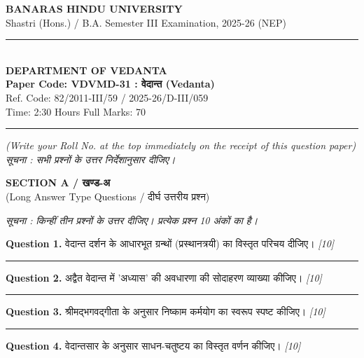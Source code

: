 \documentclass[11pt,a4paper]{article}
\newcommand{\pts}[1]{\hfill \textit{[#1]}}
\begin{document}
\begin{center}
  {\large\bfseries BANARAS HINDU UNIVERSITY}\\[2pt]
  {\normalsize Shastri (Hons.) / B.A. Semester III Examination, 2025-26 (NEP)}\\[6pt]
  \rule{0.8\linewidth}{0.5pt}\\[6pt]
  {\large\bfseries DEPARTMENT OF VEDANTA}\\[4pt]
  {\large\bfseries Paper Code: VDVMD-31 : वेदान्त (Vedanta)}\\[2pt]
  {\small Ref. Code: 82/2011-III/59 / 2025-26/D-III/059}\\[4pt]
  {\normalsize Time: 2:30 Hours \hfill Full Marks: 70}
\end{center}

\rule{\linewidth}{0.4pt}

\smallskip

\noindent \textit{(Write your Roll No. at the top immediately on the receipt of this question paper)}\\[2pt]
\noindent \textit{सूचना : सभी प्रश्नों के उत्तर निर्देशानुसार दीजिए।}

\bigskip

\begin{center}
  {\large\bfseries SECTION A / खण्ड-अ}\\[2pt]
  {\normalsize (Long Answer Type Questions / दीर्घ उत्तरीय प्रश्न)}
\end{center}

\noindent \textit{सूचना : किन्हीं तीन प्रश्नों के उत्तर दीजिए। प्रत्येक प्रश्न 10 अंकों का है।}\\[2pt]

\bigskip

\noindent \textbf{Question 1.} वेदान्त दर्शन के आधारभूत ग्रन्थों (प्रस्थानत्रयी) का विस्तृत परिचय दीजिए। \pts{10}

\medskip\rule{\linewidth}{0.2pt}\medskip

\noindent \textbf{Question 2.} अद्वैत वेदान्त में 'अध्यास' की अवधारणा की सोदाहरण व्याख्या कीजिए। \pts{10}

\medskip\rule{\linewidth}{0.2pt}\medskip

\noindent \textbf{Question 3.} श्रीमद्भगवद्गीता के अनुसार निष्काम कर्मयोग का स्वरूप स्पष्ट कीजिए। \pts{10}

\medskip\rule{\linewidth}{0.2pt}\medskip

\noindent \textbf{Question 4.} वेदान्तसार के अनुसार साधन-चतुष्टय का विस्तृत वर्णन कीजिए। \pts{10}
\end{document}
